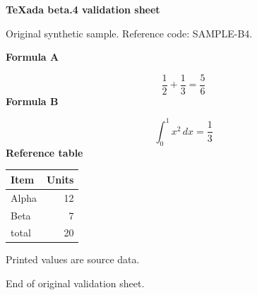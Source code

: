 \documentclass[12pt]{article}
\begin{document}
{\Large\bfseries TeXada beta.4 validation sheet}\par
Original synthetic sample. Reference code: SAMPLE-B4.\par
\textbf{Formula A}\par
\[
\frac{1}{2}+\frac{1}{3}=\frac{5}{6}
\]
\textbf{Formula B}\par
\[
\int_0^1 x^2\,dx=\frac{1}{3}
\]
\textbf{Reference table}\par
\begin{tabular}{|l|r|}
\hline
Item & Units \\
\hline
Alpha & 12 \\
Beta & 7 \\
total & 20 \\
\hline
\end{tabular}\par
Printed values are source data.\par
End of original validation sheet.
\end{document}
